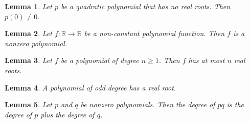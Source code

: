 \documentclass{article}
\newtheorem{lemma}{Lemma}
\begin{document}
\begin{lemma}\label{no-real-roots}
Let $p$ be a quadratic polynomial that has no real roots. Then $p(0)\neq0$.
\end{lemma}

\begin{lemma}\label{polynomial-map}
Let $f\colon\mathbb{R}\to\mathbb{R}$ be a non-constant polynomial function. Then $f$ is a nonzero polynomial.
\end{lemma}

\begin{lemma}\label{at-most-roots}
Let $f$ be a polynomial of degree $n\ge1$. Then $f$ has at most $n$ real roots.
\end{lemma}

\begin{lemma}\label{odd-degree}
A polynomial of odd degree has a real root.
\end{lemma}

\begin{lemma}\label{degree-of-product}
Let $p$ and $q$ be nonzero polynomials. Then the degree of $pq$ is the degree of $p$ plus the degree of $q$.
\end{lemma}
\end{document}
